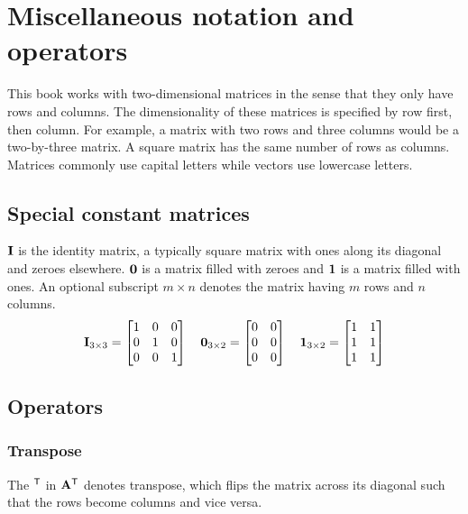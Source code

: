 \section{Miscellaneous notation and operators}

This book works with two-dimensional matrices in the sense that they only have
rows and columns. The dimensionality of these matrices is specified by row
first, then column. For example, a matrix with two rows and three columns would
be a two-by-three matrix. A square matrix has the same number of rows as
columns. Matrices commonly use capital letters while vectors use lowercase
letters.

\subsection{Special constant matrices}

$\mathbf{I}$ is the identity matrix, a typically square matrix with ones along its
diagonal and zeroes elsewhere. $\mathbf{0}$ is a matrix filled with zeroes and
$\mathbf{1}$ is a matrix filled with ones. An optional subscript ${m \times n}$
denotes the matrix having $m$ rows and $n$ columns.
\begin{equation*}
  \mathbf{I}_{3 \times 3} =
  \begin{bmatrix}
    1 & 0 & 0 \\
    0 & 1 & 0 \\
    0 & 0 & 1
  \end{bmatrix}
  \quad
  \mathbf{0}_{3 \times 2} =
  \begin{bmatrix}
    0 & 0 \\
    0 & 0 \\
    0 & 0
  \end{bmatrix}
  \quad
  \mathbf{1}_{3 \times 2} =
  \begin{bmatrix}
    1 & 1 \\
    1 & 1 \\
    1 & 1
  \end{bmatrix}
\end{equation*}

\subsection{Operators}

\subsubsection{Transpose}
The $^\mathsf{T}$ in $\mathbf{A}^\mathsf{T}$ denotes transpose, which flips the matrix across its
diagonal such that the rows become columns and vice versa.

